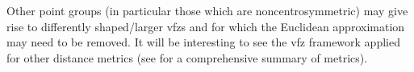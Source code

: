 \documentclass[final,twocolumn,12pt]{elsarticle}
\begin{document}
	Other point groups (in particular those which are noncentrosymmetric) may give rise to differently shaped/larger \glspl{vfz} and for which the Euclidean approximation may need to be removed. It will be interesting to see the \gls{vfz} framework applied for other distance metrics (see \citet{morawiecDistancesGrainInterfaces2019} for a comprehensive summary of metrics).
\end{document}
